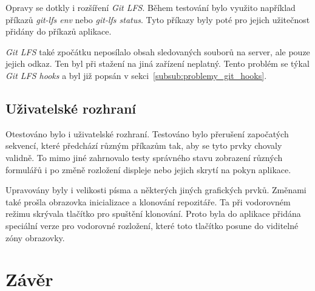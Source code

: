 Opravy se dotkly i rozšíření \emph{Git LFS}. Během testování bylo využito například příkazů \emph{git-lfs env} nebo \emph{git-lfs status}. Tyto příkazy byly poté pro jejich užitečnost přidány do příkazů aplikace.

\emph{Git LFS} také zpočátku neposílalo obsah sledovaných souborů na server, ale pouze jejich odkaz. Ten byl při stažení na jiná zařízení neplatný. Tento problém se týkal \emph{Git LFS hooks} a byl již popsán v sekci~\ref{subsub:problemy_git_hooks}.

\section{Uživatelské rozhraní}
Otestováno bylo i uživatelské rozhraní. Testováno bylo přerušení započatých sekvencí, které předchází různým příkazům tak, aby se tyto prvky chovaly validně. To mimo jiné zahrnovalo testy správného stavu zobrazení různých formulářů i po změně rozložení displeje nebo jejich skrytí na pokyn aplikace.

Upravovány byly i velikosti písma a některých jiných grafických prvků. Změnami také prošla obrazovka inicializace a klonování repozitáře. Ta při vodorovném režimu skrývala tlačítko pro spuštění klonování. Proto byla do aplikace přidána speciální verze pro vodorovné rozložení, které toto tlačítko posune do viditelné zóny obrazovky.
\chapter{Závěr}